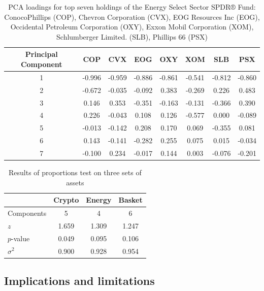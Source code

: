 \documentclass[12pt,twoside]{article}
\newcommand{\head}[1]{\textnormal{\textbf{#1}}}
\begin{document}
\begin{table}[h!]
	\centering
	\begin{tabular}{cccccccc}
		\toprule
		\head{Principal Component} & \head{COP} & \head{CVX} & \head{EOG} &      \head{OXY} & \head{XOM} & \head{SLB} & \head{PSX} \\
		\midrule
		1         & -0.996 & -0.959 & -0.886 & -0.861 & -0.541 & -0.812 & -0.860 \\
		2         & -0.672 & -0.035 & -0.092 &  0.383 & -0.269 &  0.226 &  0.483 \\
		3         &  0.146 &  0.353 & -0.351 & -0.163 & -0.131 & -0.366 &  0.390 \\
		4         &  0.226 & -0.043 &  0.108 &  0.126 & -0.577 &  0.000 & -0.089 \\
		5         & -0.013 & -0.142 &  0.208 &  0.170 &  0.069 & -0.355 &  0.081 \\
		6         &  0.143 & -0.141 & -0.282 &  0.255 &  0.075 &  0.015 & -0.034 \\
		7         & -0.100 &  0.234 & -0.017 &  0.144 &  0.003 & -0.076 & -0.201 \\
		\bottomrule
	\end{tabular}
	\caption{PCA loadings for top seven holdings of the Energy Select Sector SPDR® Fund: ConocoPhillips (COP), Chevron Corporation (CVX), EOG Resources Inc (EOG), Occidental Petroleum Corporation (OXY), Exxon Mobil Corporation (XOM), Schlumberger Limited. (SLB), Phillips 66 (PSX)}
	\label{table:6}
\end{table}


\begin{table}[h!]
	\centering
	\begin{tabular}{lccc}
		\toprule
		{} &  \head{Crypto} &  \head{Energy} &  \head{Basket} \\
		\midrule
		Components &   5 &   4 &   6 \\
		$z$        &   1.659 &   1.309 &   1.247 \\
		$p$-value  &   0.049 &   0.095 &   0.106 \\
		$\sigma^2$ &   0.900 &   0.928 &   0.954 \\
		\bottomrule
	\end{tabular}
	\caption{Results of proportions test on three sets of assets}
	\label{table:7}
\end{table}

\subsection*{Implications and limitations}
\end{document}
